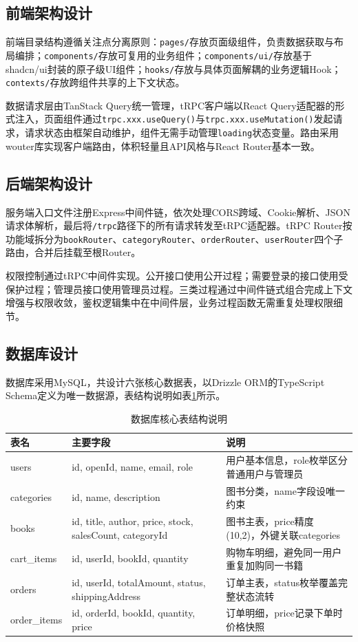 \documentclass[12pt,a4paper]{ctexart}
\begin{document}
\subsection{前端架构设计}

前端目录结构遵循关注点分离原则：\texttt{pages/}存放页面级组件，负责数据获取与布局编排；\texttt{components/}存放可复用的业务组件；\texttt{components/ui/}存放基于shadcn/ui封装的原子级UI组件；\texttt{hooks/}存放与具体页面解耦的业务逻辑Hook；\texttt{contexts/}存放跨组件共享的上下文状态。

数据请求层由TanStack Query统一管理，tRPC客户端以React Query适配器的形式注入，页面组件通过\texttt{trpc.xxx.useQuery()}与\texttt{trpc.xxx.useMutation()}发起请求，请求状态由框架自动维护，组件无需手动管理\texttt{loading}状态变量。路由采用wouter库实现客户端路由，体积轻量且API风格与React Router基本一致。

\subsection{后端架构设计}

服务端入口文件注册Express中间件链，依次处理CORS跨域、Cookie解析、JSON请求体解析，最后将\texttt{/trpc}路径下的所有请求转发至tRPC适配器。tRPC Router按功能域拆分为\texttt{bookRouter}、\texttt{categoryRouter}、\texttt{orderRouter}、\texttt{userRouter}四个子路由，合并后挂载至根Router。

权限控制通过tRPC中间件实现。公开接口使用公开过程；需要登录的接口使用受保护过程；管理员接口使用管理员过程。三类过程通过中间件链式组合完成上下文增强与权限收敛，鉴权逻辑集中在中间件层，业务过程函数无需重复处理权限细节。

\subsection{数据库设计}

数据库采用MySQL，共设计六张核心数据表，以Drizzle ORM的TypeScript Schema定义为唯一数据源，表结构说明如表\ref{tab:db-tables}所示。

\begin{table}[H]
  \centering
  \caption{数据库核心表结构说明}
  \label{tab:db-tables}
  \begin{tabularx}{\textwidth}{p{2.5cm} p{5.1cm} X}
    \toprule
    表名 & 主要字段 & 说明 \\
    \midrule
    users & id, openId, name, email, role & 用户基本信息，role枚举区分普通用户与管理员 \\
    categories & id, name, description & 图书分类，name字段设唯一约束 \\
    books & id, title, author, price, stock, salesCount, categoryId & 图书主表，price精度(10,2)，外键关联categories \\
    cart\_items & id, userId, bookId, quantity & 购物车明细，避免同一用户重复加购同一书籍 \\
    orders & id, userId, totalAmount, status, shippingAddress & 订单主表，status枚举覆盖完整状态流转 \\
    order\_items & id, orderId, bookId, quantity, price & 订单明细，price记录下单时价格快照 \\
    \bottomrule
  \end{tabularx}
\end{table}
\end{document}
